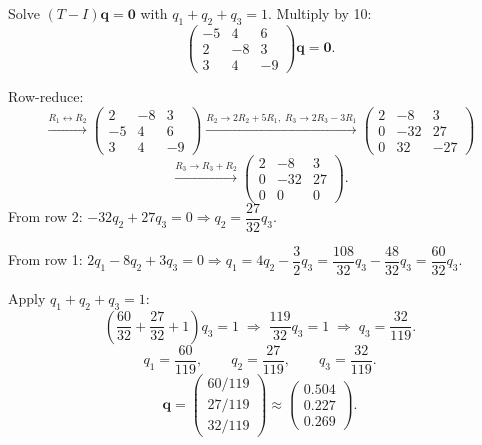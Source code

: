 \documentclass[12pt,a3paper]{article}
\begin{document}
\begin{tcolorbox}[enhanced,breakable,
  colback=cA!4,colframe=cA,boxrule=0.8pt,arc=5pt,
  title={\textbf{Answer --- Markov Steady-State of
    $T=\begin{pmatrix}0.5&0.4&0.6\\0.2&0.2&0.3\\0.3&0.4&0.1\end{pmatrix}$}},
  fonttitle=\bfseries\color{white},colbacktitle=cA]

Solve $(T-I)\mathbf{q}=\mathbf{0}$ with $q_1+q_2+q_3=1$. Multiply by 10:
\[
  \begin{pmatrix}-5&4&6\\2&-8&3\\3&4&-9\end{pmatrix}\mathbf{q}=\mathbf{0}.
\]

Row-reduce:
\[
  \xrightarrow{R_1\leftrightarrow R_2}
  \begin{pmatrix}2&-8&3\\-5&4&6\\3&4&-9\end{pmatrix}
  \xrightarrow{R_2\to 2R_2+5R_1,\;R_3\to 2R_3-3R_1}
  \begin{pmatrix}2&-8&3\\0&-32&27\\0&32&-27\end{pmatrix}
\]
\[
  \xrightarrow{R_3\to R_3+R_2}
  \begin{pmatrix}2&-8&3\\0&-32&27\\0&0&0\end{pmatrix}.
\]
From row 2: $-32q_2 + 27q_3 = 0 \Rightarrow q_2 = \dfrac{27}{32}q_3$.

From row 1: $2q_1 - 8q_2 + 3q_3 = 0 \Rightarrow q_1 = 4q_2 - \dfrac{3}{2}q_3
= \dfrac{108}{32}q_3 - \dfrac{48}{32}q_3 = \dfrac{60}{32}q_3$.

Apply $q_1+q_2+q_3 = 1$:
\[
  \left(\frac{60}{32}+\frac{27}{32}+1\right)q_3 = 1
  \;\Rightarrow\; \frac{119}{32}q_3 = 1
  \;\Rightarrow\; q_3 = \frac{32}{119}.
\]
\[
  q_1 = \frac{60}{119}, \qquad q_2 = \frac{27}{119}, \qquad q_3 = \frac{32}{119}.
\]
\[
  \boxed{\mathbf{q} = \begin{pmatrix}60/119\\27/119\\32/119\end{pmatrix}
  \approx \begin{pmatrix}0.504\\0.227\\0.269\end{pmatrix}.}
\]

\end{tcolorbox}
\end{document}
